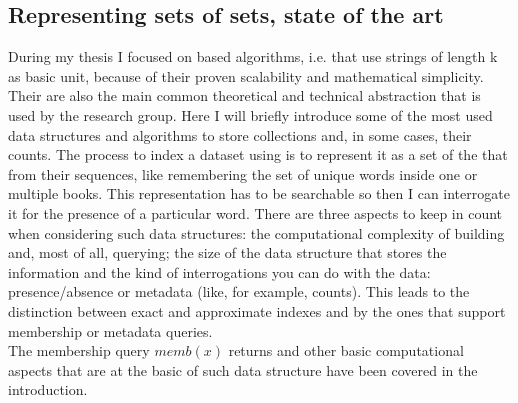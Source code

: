 \subsection{Representing sets of \kmer sets, state of the art}
During my thesis I focused on \kmer based algorithms, i.e. that use strings of length k as basic unit, because of their proven scalability and mathematical simplicity. Their are also the main common theoretical and technical abstraction that is used by the research group.  
Here I will briefly introduce some of the most used data structures and algorithms to store collections \kmers and, in some cases, their counts. The process to index a dataset using \kmers is to represent it as a set of the \kmers that from their sequences, like remembering the set of unique words inside one or multiple books. This representation has to be searchable so then I can interrogate it for the presence of a particular word.  There are three aspects to keep in count when considering such data structures: the computational complexity of building and, most of all, querying; the size of the data structure that stores the information and the kind of interrogations you can do with the data: presence/absence or metadata (like, for example, counts). This leads to the distinction between exact and approximate indexes and by the ones that support membership or metadata queries.\\
The membership query $memb(x)$ returns 
\kmers and other basic computational aspects that are at the basic of such data structure have been covered in the introduction.

